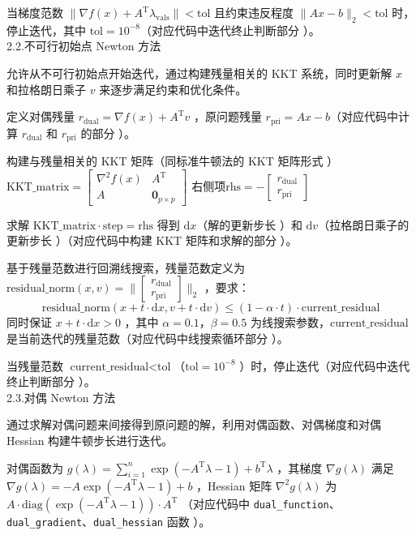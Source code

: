 \documentclass{article}
\newenvironment{solution_cn}{%
  \begin{proof}[解答]%
  \kaishu  %
}{%
  \end{proof}%
}
\begin{document}
\begin{solution_cn}
当梯度范数 \( \|\nabla f(x) + A^{\mathrm{T}} \lambda_{\text{vals}}\| < \text{tol} \) 且约束违反程度 \( \|A x - b\|_2 < \text{tol} \) 时，停止迭代，其中 \( \text{tol} = 10^{-8} \)（对应代码中迭代终止判断部分 ）。\\
2.2.不可行初始点 Newton 方法

允许从不可行初始点开始迭代，通过构建残量相关的 KKT 系统，同时更新解 \( x \) 和拉格朗日乘子 \( v \) 来逐步满足约束和优化条件。

定义对偶残量 \( r_{\text{dual}} = \nabla f(x) + A^{\mathrm{T}} v \) ，原问题残量 \( r_{\text{pri}} = A x - b \)（对应代码中计算 \( r_{\text{dual}} \) 和 \( r_{\text{pri}} \) 的部分 ）。

构建与残量相关的 KKT 矩阵（同标准牛顿法的 KKT 矩阵形式 ）$
\text{KKT\_matrix} = \begin{bmatrix} 
\nabla^2 f(x) & A^{\mathrm{T}} \\
A & \mathbf{0}_{p \times p} 
\end{bmatrix}$
右侧项$\text{rhs} = -\begin{bmatrix} r_{\text{dual}} \\ r_{\text{pri}} \end{bmatrix}$

求解 \( \text{KKT\_matrix} \cdot \text{step} = \text{rhs} \) 得到 \( \mathrm{d}x \)（解的更新步长 ）和 \( \mathrm{d}v \)（拉格朗日乘子的更新步长 ）（对应代码中构建 KKT 矩阵和求解的部分 ）。

基于残量范数进行回溯线搜索，残量范数定义为 \( \text{residual\_norm}(x, v) = \|\begin{bmatrix} r_{\text{dual}} \\ r_{\text{pri}} \end{bmatrix}\|_2 \) ，要求：
\[
\text{residual\_norm}(x + t \cdot \mathrm{d}x, v + t \cdot \mathrm{d}v) \leq (1 - \alpha \cdot t) \cdot \text{current\_residual}
\]
同时保证 \( x + t \cdot \mathrm{d}x > 0 \) ，其中 \( \alpha = 0.1 \)，\( \beta = 0.5 \) 为线搜索参数，\( \text{current\_residual} \) 是当前迭代的残量范数（对应代码中线搜索循环部分 ）。

当残量范数 \( \text{current\_residual} < \text{tol} \)（\( \text{tol} = 10^{-8} \) ）时，停止迭代（对应代码中迭代终止判断部分 ）。\\
2.3.对偶 Newton 方法

通过求解对偶问题来间接得到原问题的解，利用对偶函数、对偶梯度和对偶 Hessian 构建牛顿步长进行迭代。

对偶函数为 \( g(\lambda) = \sum_{i = 1}^{n} \exp(-A^{\mathrm{T}} \lambda - 1) + b^{\mathrm{T}} \lambda \) ，其梯度 \( \nabla g(\lambda) \) 满足 \( \nabla g(\lambda) = -A \exp(-A^{\mathrm{T}} \lambda - 1) + b \) ，Hessian 矩阵 \( \nabla^2 g(\lambda) \) 为 \( A \cdot \text{diag}(\exp(-A^{\mathrm{T}} \lambda - 1)) \cdot A^{\mathrm{T}} \) （对应代码中 \texttt{dual\_function}、\texttt{dual\_gradient}、\texttt{dual\_hessian} 函数 ）。


\end{solution_cn}
\end{document}
